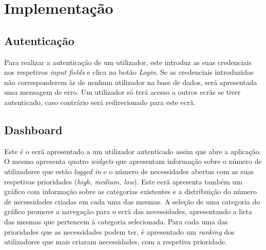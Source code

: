 \section{Implementação}\label{sec:implementacao}

\subsection{Autenticação}\label{subsec:implementacao:login}

Para realizar a autenticação de um utilizador, este introduz as suas credenciais nos respetivos \textit{input fields} e clica no botão \textit{Login}.
Se as credenciais introduzidas não corresponderem às de nenhum utilizador na base de dados, será apresentada uma mensagem de erro.
Um utilizador só terá acesso a outros ecrãs se tiver autenticado, caso contrário será redirecionado para este ecrã.

\subsection{Dashboard}\label{subsec:implementacao:dashboard}
Este é o ecrã apresentado a um utilizador autenticado assim que abre a aplicação.
O mesmo apresenta quatro \textit{widgets} que apresentam informação sobre o número de utilizadores que estão \textit{logged in} e o número de necessidades abertas com as suas respetivas prioridades (\textit{high, medium, low}).
Este ecrã apresenta também um gráfico com informação sobre as categorias existentes e a distribuição do número de necessidades criadas em cada uma das mesmas.
A seleção de uma categoria do gráfico promove a navegação para o ecrã das necessidades,  apresentando a lista das mesmas que pertencem à categoria selecionada.
Para cada uma das prioridades que as necessidades podem ter, é apresentado um \textit{ranking} dos utilizadores que mais criaram necessidades, com a respetiva prioridade.

